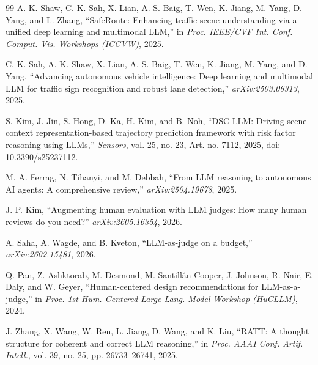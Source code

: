 \documentclass[a4paper,12pt]{report}
\begin{document}
\begin{thebibliography}{99}
A. K. Shaw, C. K. Sah, X. Lian, A. S. Baig, T. Wen, K. Jiang, M. Yang, D. Yang, and L. Zhang, ``SafeRoute: Enhancing traffic scene understanding via a unified deep learning and multimodal LLM,'' in \textit{Proc. IEEE/CVF Int. Conf. Comput. Vis. Workshops (ICCVW)}, 2025.

C. K. Sah, A. K. Shaw, X. Lian, A. S. Baig, T. Wen, K. Jiang, M. Yang, and D. Yang, ``Advancing autonomous vehicle intelligence: Deep learning and multimodal LLM for traffic sign recognition and robust lane detection,'' \textit{arXiv:2503.06313}, 2025.

S. Kim, J. Jin, S. Hong, D. Ka, H. Kim, and B. Noh, ``DSC-LLM: Driving scene context representation-based trajectory prediction framework with risk factor reasoning using LLMs,'' \textit{Sensors}, vol. 25, no. 23, Art. no. 7112, 2025, doi: 10.3390/s25237112.

M. A. Ferrag, N. Tihanyi, and M. Debbah, ``From LLM reasoning to autonomous AI agents: A comprehensive review,'' \textit{arXiv:2504.19678}, 2025.

J. P. Kim, ``Augmenting human evaluation with LLM judges: How many human reviews do you need?'' \textit{arXiv:2605.16354}, 2026.

A. Saha, A. Wagde, and B. Kveton, ``LLM-as-judge on a budget,'' \textit{arXiv:2602.15481}, 2026.

Q. Pan, Z. Ashktorab, M. Desmond, M. Santill\'an Cooper, J. Johnson, R. Nair, E. Daly, and W. Geyer, ``Human-centered design recommendations for LLM-as-a-judge,'' in \textit{Proc. 1st Hum.-Centered Large Lang. Model Workshop (HuCLLM)}, 2024.

J. Zhang, X. Wang, W. Ren, L. Jiang, D. Wang, and K. Liu, ``RATT: A thought structure for coherent and correct LLM reasoning,'' in \textit{Proc. AAAI Conf. Artif. Intell.}, vol. 39, no. 25, pp. 26733--26741, 2025.

\end{thebibliography}
\end{document}
